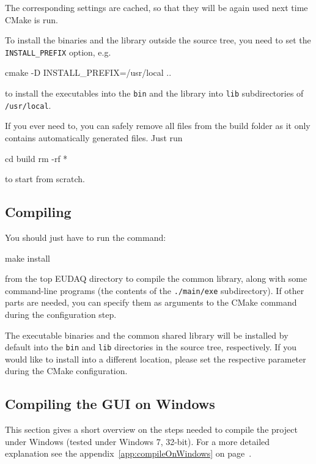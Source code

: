 The corresponding settings are cached, so that they will be again used
next time CMake is run.

To install the binaries and the library outside the source tree, you
need to set the \texttt{INSTALL\_PREFIX} option, e.g.
\begin{listing}[mybash]
cmake -D INSTALL_PREFIX=/usr/local ..
\end{listing}
to install the executables into the \texttt{bin} and the library into \texttt{lib} subdirectories of \texttt{/usr/local}.

If you ever need to, you can safely remove all files from the build folder
as it only contains automatically generated files. Just run
\begin{listing}[mybash]
cd build
rm -rf *
\end{listing}
to start from scratch.


\subsection{Compiling}
You should just have to run the command:
\begin{listing}[mybash]
make install
\end{listing}

from the top EUDAQ directory to compile the common library,
along with some command-line programs (the contents of the \texttt{./main/exe} subdirectory).
If other parts are needed, you can specify them as arguments to the
CMake command during the configuration step.

The executable binaries and the common shared library will be installed by default into the
\texttt{bin} and \texttt{lib} directories in the source tree,
respectively. If you would like to install into a different location,
please set the respective parameter during the CMake configuration.

\subsection{Compiling the GUI on Windows}

This section gives a short overview on the steps needed to compile the project under
Windows (tested under Windows 7, 32-bit). For a more detailed
explanation see the appendix~\ref{app:compileOnWindows} on page~\pageref{app:compileOnWindows}.

